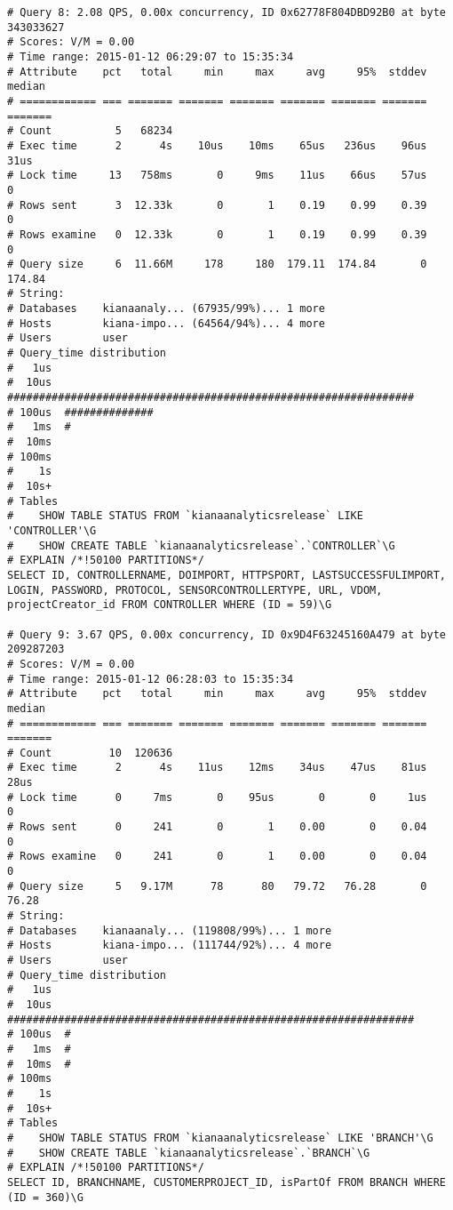 \begin{appendix}
\begin{footnotesize}
\begin{verbatim}
# Query 8: 2.08 QPS, 0.00x concurrency, ID 0x62778F804DBD92B0 at byte 343033627
# Scores: V/M = 0.00
# Time range: 2015-01-12 06:29:07 to 15:35:34
# Attribute    pct   total     min     max     avg     95%  stddev  median
# ============ === ======= ======= ======= ======= ======= ======= =======
# Count          5   68234
# Exec time      2      4s    10us    10ms    65us   236us    96us    31us
# Lock time     13   758ms       0     9ms    11us    66us    57us       0
# Rows sent      3  12.33k       0       1    0.19    0.99    0.39       0
# Rows examine   0  12.33k       0       1    0.19    0.99    0.39       0
# Query size     6  11.66M     178     180  179.11  174.84       0  174.84
# String:
# Databases    kianaanaly... (67935/99%)... 1 more
# Hosts        kiana-impo... (64564/94%)... 4 more
# Users        user
# Query_time distribution
#   1us
#  10us  ################################################################
# 100us  ##############
#   1ms  #
#  10ms
# 100ms
#    1s
#  10s+
# Tables
#    SHOW TABLE STATUS FROM `kianaanalyticsrelease` LIKE 'CONTROLLER'\G
#    SHOW CREATE TABLE `kianaanalyticsrelease`.`CONTROLLER`\G
# EXPLAIN /*!50100 PARTITIONS*/
SELECT ID, CONTROLLERNAME, DOIMPORT, HTTPSPORT, LASTSUCCESSFULIMPORT, LOGIN, PASSWORD, PROTOCOL, SENSORCONTROLLERTYPE, URL, VDOM, projectCreator_id FROM CONTROLLER WHERE (ID = 59)\G

# Query 9: 3.67 QPS, 0.00x concurrency, ID 0x9D4F63245160A479 at byte 209287203
# Scores: V/M = 0.00
# Time range: 2015-01-12 06:28:03 to 15:35:34
# Attribute    pct   total     min     max     avg     95%  stddev  median
# ============ === ======= ======= ======= ======= ======= ======= =======
# Count         10  120636
# Exec time      2      4s    11us    12ms    34us    47us    81us    28us
# Lock time      0     7ms       0    95us       0       0     1us       0
# Rows sent      0     241       0       1    0.00       0    0.04       0
# Rows examine   0     241       0       1    0.00       0    0.04       0
# Query size     5   9.17M      78      80   79.72   76.28       0   76.28
# String:
# Databases    kianaanaly... (119808/99%)... 1 more
# Hosts        kiana-impo... (111744/92%)... 4 more
# Users        user
# Query_time distribution
#   1us
#  10us  ################################################################
# 100us  #
#   1ms  #
#  10ms  #
# 100ms
#    1s
#  10s+
# Tables
#    SHOW TABLE STATUS FROM `kianaanalyticsrelease` LIKE 'BRANCH'\G
#    SHOW CREATE TABLE `kianaanalyticsrelease`.`BRANCH`\G
# EXPLAIN /*!50100 PARTITIONS*/
SELECT ID, BRANCHNAME, CUSTOMERPROJECT_ID, isPartOf FROM BRANCH WHERE (ID = 360)\G


\end{verbatim}
\end{footnotesize}
\end{appendix}
